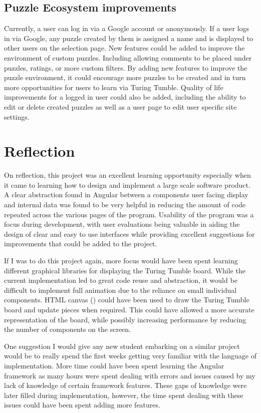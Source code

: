 \documentclass{l4proj}
\begin{document}
\subsection{Puzzle Ecosystem improvements}
Currently, a user can log in via a Google account or anonymously. If a user logs in via Google, any puzzle created by them is assigned a name and is displayed to other users on the selection page. New features could be added to improve the environment of custom puzzles. Including allowing comments to be placed under puzzles, ratings, or more custom filters. By adding new features to improve the puzzle environment, it could encourage more puzzles to be created and in turn more opportunities for users to learn via Turing Tumble. Quality of life improvements for a logged in user could also be added, including the ability to edit or delete created puzzles as well as a user page to edit user specific site settings.

\section{Reflection}
On reflection, this project was an excellent learning opportunity especially when it came to learning how to design and implement a large scale software product. A clear abstraction found in Angular between a components user facing display and internal data was found to be very helpful in reducing the amount of code repeated across the various pages of the program. Usability of the program was a focus during development, with user evaluations being valuable in aiding the design of clear and easy to use interfaces while providing excellent suggestions for improvements that could be added to the project.

If I was to do this project again, more focus would have been spent learning different graphical libraries for displaying the Turing Tumble board. While the current implementation led to great code reuse and abstraction, it would be difficult to implement full animation due to the reliance on small individual components. HTML canvas (\cite{html_canvas}) could have been used to draw the Turing Tumble board and update pieces when required. This could have allowed a more accurate representation of the board, while possibly increasing performance by reducing the number of components on the screen.

One suggestion I would give any new student embarking on a similar project would be to really spend the first weeks getting very familiar with the language of implementation. More time could have been spent learning the Angular framework as many hours were spent dealing with errors and issues caused by my lack of knowledge of certain framework features. These gaps of knowledge were later filled during implementation, however, the time spent dealing with these issues could have been spent adding more features. 
\end{document}
